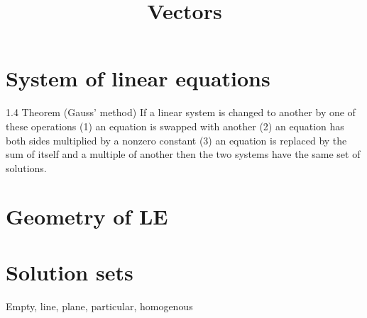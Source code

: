 \documentclass{article}
\title{Vectors}
\date{}
\begin{document}
\maketitle

\section{System of linear equations}

1.4 Theorem (Gauss’ method) If a linear system is changed to another by
one of these operations
(1) an equation is swapped with another
(2) an equation has both sides multiplied by a nonzero constant
(3) an equation is replaced by the sum of itself and a multiple of another
then the two systems have the same set of solutions.

\section{Geometry of LE}

\section{Solution sets}

Empty, line, plane, particular, homogenous
\end{document}
